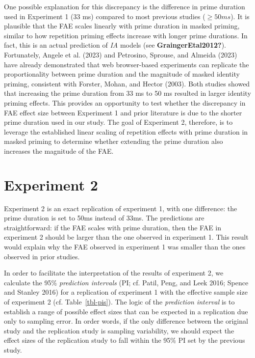 \documentclass[
]{interact}
\begin{document}
One possible explanation for this discrepancy is the difference in prime
duration used in Experiment 1 (33 ms) compared to most previous studies
(\(\geq 50 ms\)). It is plausible that the FAE scales linearly with
prime duration in masked priming, similar to how repetition priming
effects increase with longer prime durations. In fact, this is an actual
prediction of \emph{IA} models (see \textbf{GraingerEtal2012?}).
Fortunately, Angele et al. (2023) and Petrosino, Sprouse, and Almeida
(2023) have already demonstrated that web browser-based experiments can
replicate the proportionality between prime duration and the magnitude
of masked identity priming, consistent with Forster, Mohan, and Hector
(2003). Both studies showed that increasing the prime duration from 33
ms to 50 ms resulted in larger identity priming effects. This provides
an opportunity to test whether the discrepancy in FAE effect size
between Experiment 1 and prior literature is due to the shorter prime
duration used in our study. The goal of Experiment 2, therefore, is to
leverage the established linear scaling of repetition effects with prime
duration in masked priming to determine whether extending the prime
duration also increases the magnitude of the FAE.

\section{Experiment 2}\label{sec-exp2}

Experiment 2 is an exact replication of experiment 1, with one
difference: the prime duration is set to 50ms instead of 33ms. The
predictions are straightforward: if the FAE scales with prime duration,
then the FAE in experiment 2 should be larger than the one observed in
experiment 1. This result would explain why the FAE observed in
experiment 1 was smaller than the ones observed in prior studies.

In order to facilitate the interpretation of the results of experiment
2, we calculate the 95\% \emph{prediction intervals} (PI; cf. Patil,
Peng, and Leek 2016; Spence and Stanley 2016) for a replication of
experiment 1 with the effective sample size of experiment 2 (cf.
Table~\ref{tbl-pis}). The logic of the \emph{prediction interval} is to
establish a range of possible effect sizes that can be expected in a
replication due only to sampling error. In order words, if the only
difference between the original study and the replication study is
sampling variability, we should expect the effect sizes of the
replication study to fall within the 95\% PI set by the previous study.
\end{document}
